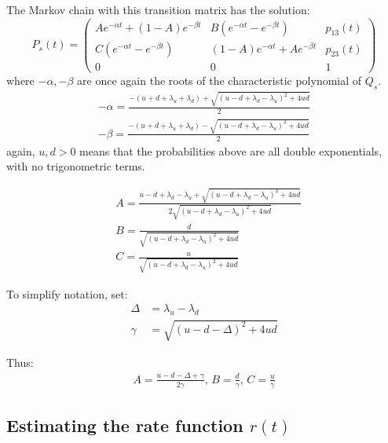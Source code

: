 The Markov chain with this transition matrix has the solution:
\begin{equation}
P_s(t) =
\begin{pmatrix}
Ae^{-\alpha t} + (1-A)e^{-\beta t} & B\left(e^{-\alpha t} - e^{-\beta t}\right) & p_{13}(t) \\
C\left(e^{-\alpha t} - e^{-\beta t}\right) & (1-A)e^{-\alpha t} + Ae^{-\beta t} & p_{23}(t)\\
0 & 0 & 1
\end{pmatrix}
\end{equation}
where $-\alpha,-\beta$ are once again the roots of the characteristic polynomial of $Q_s$.
\begin{equation}
\begin{split}
-\alpha = \frac{-(u+d+\lambda_u+\lambda_d) + \sqrt{(u-d+\lambda_d-\lambda_u)^2+4ud}}{2}\\
-\beta = \frac{-(u+d+\lambda_u+\lambda_d) - \sqrt{(u-d+\lambda_d-\lambda_u)^2+4ud}}{2}
\end{split}
\end{equation}
again, $u,d>0$ means that the probabilities above are all double exponentials, with no trigonometric terms.

\begin{equation}
\begin{split}
& A = \frac{u-d+\lambda_d-\lambda_u + \sqrt{(u-d+\lambda_d-\lambda_u)^2+4ud}}{2\sqrt{(u-d+\lambda_d-\lambda_u)^2 + 4ud}}\\
& B = \frac{d}{\sqrt{(u-d+\lambda_d-\lambda_u)^2 + 4ud}}\\
& C = \frac{u}{\sqrt{(u-d+\lambda_d-\lambda_u)^2 + 4ud}}
\end{split}
\end{equation}

To simplify notation, set:
\begin{equation}
\begin{split}
\label{dg}
\Delta &= \lambda_u - \lambda_d\\
\gamma &= \sqrt{(u-d-\Delta)^2 + 4ud}
\end{split}
\end{equation}

Thus:
\begin{equation}
\begin{split}
A = \frac{u-d - \Delta + \gamma}{2\gamma},\, B = \frac{d}{\gamma}, \,C = \frac{u}{\gamma}
\end{split}
\end{equation}

\subsection{Estimating the rate function $r(t)$}

